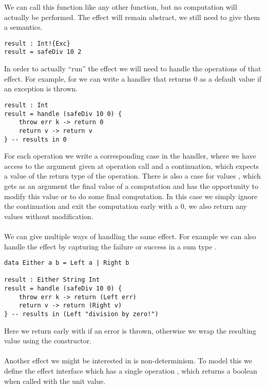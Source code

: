 We can call this function like any other function, but no computation will actually be performed.
The effect will remain abstract, we still need to give them a semantics.

\begin{verbatim}
result : Int!{Exc}
result = safeDiv 10 2
\end{verbatim}

In order to actually ``run'' the effect we will need to handle the operations of that effect.
For example, for  we can write a handler that returns $0$ as a default value if an exception is thrown.

\begin{verbatim}
result : Int
result = handle (safeDiv 10 0) {
	throw err k -> return 0
	return v -> return v
} -- results in 0
\end{verbatim}

For each operation we write a corresponding case in the handler, where we have access to the argument given at operation call and a continuation, which expects a value of the return type of the operation.
There is also a case for values , which gets as an argument the final value of a computation and has the opportunity to modify this value or to do some final computation.
In this case we simply ignore the continuation and exit the computation early with a $0$, we also return any values without modification.
\\\\
We can give multiple ways of handling the same effect.
For example we can also handle the  effect by capturing the failure or success in a sum type .

\begin{verbatim}
data Either a b = Left a | Right b

result : Either String Int
result = handle (safeDiv 10 0) {
	throw err k -> return (Left err)
	return v -> return (Right v)
} -- results in (Left "division by zero!")
\end{verbatim}

Here we return early with  if an error is thrown, otherwise we wrap the resulting value using the  constructor.
\\\\
Another effect we might be interested in is non-determinism.
To model this we define the  effect interface which has a single operation , which returns a boolean when called with the unit 
value.

